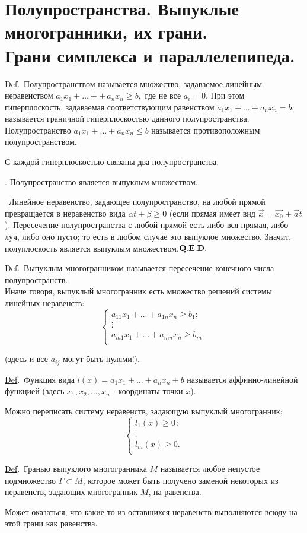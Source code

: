 \documentclass[draft]{article}%
\newcommand{\de}{\par\noindent\underline{Def}.\ }%
\newcommand{\ab}{\par\noindent}%
\newcommand{\dok}{\par\noindent{\textsl{Доказательство}.}\ }%
\newcommand{\qed}{\quad${{\bf Q.E.D.}}$}
\newcommand{\nn}[1]{#1_1,#1_2,\dots,#1_n}%
\newcommand{\oi}[1]{\overrightarrow{#1}}%
\renewcommand{\le}{\leqslant}
\renewcommand{\ge}{\geqslant}
\begin{document}
\section{Полупространства. Выпуклые многогранники, их грани.\\ Грани симплекса и параллелепипеда.}
\label{q40}%
\de Полупространством называется множество, задаваемое линейным неравенством $a_1x_1+\dots++\,a_nx_n\ge b,$ где не
все $a_i=0.$ При этом гиперплоскость, задаваемая соответствующим равенством $a_1x_1+\dots+a_nx_n=b$, называется
граничной гиперплоскостью данного полупространства. Полупространство $a_1x_1+\dots+a_nx_n\le b$ называется
противоположным полупространством. %
\ab С каждой гиперплоскостью связаны два полупространства.%
\ab{\bf Утверждение}. Полупространство является выпуклым множеством.%
\dok Линейное неравенство, задающее полупространство, на любой прямой превращается в неравенство вида $\alpha
t+\beta\ge 0$ (если прямая имеет вид $\oi{x}=\oi{x_0}+\oi{a}t$). Пересечение полупространства с любой прямой есть
либо вся прямая, либо луч, либо оно пусто; то есть в любом случае это выпуклое множество. Значит, полуплоскость
является выпуклым множеством.\qed %
\de Выпуклым многогранником называется пересечение конечного числа полупространств.\\ Иначе говоря, выпуклый
многогранник есть множество решений системы линейных неравенств:
$$\left\{%
\begin{array}{ll}
    a_{11}x_1+\dots+a_{1n}x_n\ge b_1;\\
    \vdots\\
    a_{m1}x_1+\dots+a_{mn}x_n\ge b_m.\\
\end{array}%
\right.$$
\ab(здесь и все $a_{ij}$ могут быть нулями!).
\de Функция вида $l(x)=a_1x_1+\dots+a_nx_n+b$ называется аффинно-линейной функцией (здесь $\nn{x}$ - координаты точки $x$).
\ab Можно переписать систему неравенств, задающую выпуклый многогранник:
$$\left\{%
\begin{array}{ll}
    l_1(x)\ge 0\,;\\
    \vdots\\
    l_m(x)\ge 0.\\
\end{array}%
\right.
$$
\de Гранью выпуклого многогранника $M$ называется любое непустое подмножество $\Gamma\subset M$, которое может быть получено
заменой некоторых из неравенств, задающих многогранник $M$, на равенства.
\ab{\bf !} Может оказаться, что какие-то из оставшихся неравенств выполняются всюду на этой грани как равенства.
\end{document}
